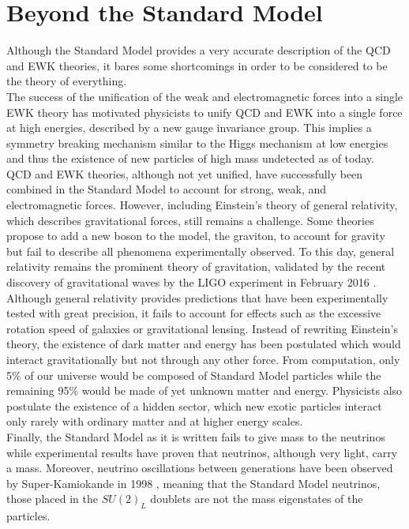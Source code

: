   \section{Beyond the Standard Model}

    Although the Standard Model provides a very accurate description of the QCD and EWK theories, it bares some shortcomings in order to be considered to be the theory of everything. \\

    The success of the unification of the weak and electromagnetic forces into a single EWK theory has motivated physicists to unify QCD and EWK into a single force at high energies, described by a new gauge invariance group. This implies a symmetry breaking mechanism similar to the Higgs mechanism at low energies and thus the existence of new particles of high mass undetected as of today. \\

    QCD and EWK theories, although not yet unified, have successfully been combined in the Standard Model to account for strong, weak, and electromagnetic forces. However, including Einstein's theory of general relativity, which describes gravitational forces, still remains a challenge. Some theories propose to add a new boson to the model, the graviton, to account for gravity but fail to describe all phenomena experimentally observed. To this day, general relativity remains the prominent theory of gravitation, validated by the recent discovery of gravitational waves by the LIGO experiment in February 2016 \cite{PhysRevLett.116.061102}. \\

    Although general relativity provides predictions that have been experimentally tested with great precision, it fails to account for effects such as the excessive rotation speed of galaxies or gravitational lensing. Instead of rewriting Einstein's theory, the existence of dark matter and energy has been postulated which would interact gravitationally but not through any other force. From computation, only 5\% of our universe would be composed of Standard Model particles while the remaining 95\% would be made of yet unknown matter and energy. Physicists also postulate the existence of a hidden sector, which new exotic particles interact only rarely with ordinary matter and at higher energy scales. \\

    Finally, the Standard Model as it is written fails to give mass to the neutrinos while experimental results have proven that neutrinos, although very light, carry a mass. Moreover, neutrino oscillations between generations have been observed by Super-Kamiokande in 1998 \cite{Fukuda:1998mi}, meaning that the Standard Model neutrinos, those placed in the $ SU(2)_L $ doublets are not the mass eigenstates of the particles. \\

